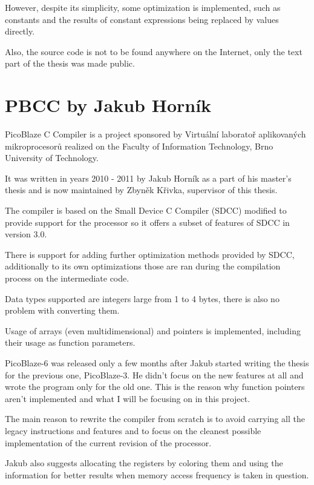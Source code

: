     However, despite its simplicity, some optimization is implemented, 
    such as constants and the results of constant expressions being replaced by values directly.

    Also, the source code is not to be found anywhere on the Internet, only the text part of the thesis was made public.


    \section{PBCC by Jakub Horník}\label{prev_pbcc}


    PicoBlaze C Compiler is a project sponsored by Virtuální laboratoř aplikovaných mikroprocesorů %
    realized on the Faculty of Information Technology, Brno University of Technology.

    It was written in years 2010 - 2011 by Jakub Horník as a part of his master's thesis and is now maintained by Zbyněk Křivka, supervisor of this thesis.

    The compiler is based on the Small Device C Compiler (SDCC) modified to provide support for the processor so it offers a subset of features of SDCC in version 3.0.

    There is support for adding further optimization methods provided by SDCC, additionally to its own optimizations those are ran during the compilation process on the intermediate code.

    Data types supported are integers large from 1 to 4 bytes, there is also no problem with converting them.

    Usage of arrays (even multidimensional) and pointers is implemented, including their usage as function parameters.

    PicoBlaze-6 was released only a few months after Jakub started writing the thesis for the previous one, PicoBlaze-3. 
    He didn't focus on the new features at all and wrote the program only for the old one.
    This is the reason why function pointers aren't implemented and what I will be focusing on in this project.

    The main reason to rewrite the compiler from scratch is to avoid carrying all the legacy instructions and features and to focus on the cleanest possible implementation of the current revision of the processor.

    Jakub also suggests allocating the registers by coloring them and using the information for better results when memory access frequency is taken in question.


